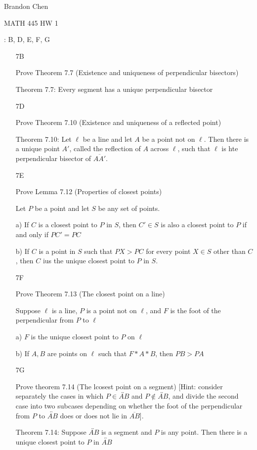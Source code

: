 \documentclass[11pt]{article}
\newcommand{\lines}[1]{\overleftrightarrow{#1}}
\newcommand{\segment}[1]{\overline{#1}}
\begin{document}
\noindent Brandon Chen

\noindent MATH 445 HW 1

: B, D, E, F, G

\begin{itemize}
\item[7B]

	Prove Theorem 7.7 (Existence and uniqueness of perpendicular bisectors)

	Theorem 7.7: Every segment has a unique perpendicular bisector

\item[7D]

	Prove Theorem 7.10 (Existence and uniqueness of a reflected point)

	Theorem 7.10: Let $\ell$ be a line and let $A$ be a point not on $\ell$. Then there is a unique point $A'$, called the reflection of $A$ across $\ell$, such that $\ell$ is hte perpendicular bisector of $\segment{AA'}$.

\item[7E]

	Prove Lemma 7.12 (Properties of closest points)

	Let $P$ be a point and let $S$ be any set of points.

		a) If $C$ is a closest point to $P$ in $S$, then $C' \in S$ is also a closest point to $P$ if and only if $PC' = PC$

		b) If $C$ is a point in $S$ such that $PX > PC$ for every point $X \in S$ other than $C$, then $C$ ius the unique closest point to $P$ in $S$.

\item[7F]

	Prove Theorem 7.13 (The closest point on a line)

	Suppose $\ell$ is a line, $P$ is a point not on $\ell$, and $F$ is the foot of the perpendicular from $P$ to $\ell$ 

	a) $F$ is the unique closest point to $P$ on $\ell$

	b) If $A, B$ are points on $\ell$ such that $F * A * B$, then $PB > PA$

\item[7G]

	Prove theorem 7.14 (The lcosest point on a segment) [Hint: consider separately the cases in which $P\in \lines{AB}$ and $P\not\in \lines{AB}$, and divide the second case into two subcases depending on whether the foot of the perpendicular from $P$ to $\lines{AB}$ does or does not lie in $\segment{AB}$].

	Theorem 7.14: Suppose $\lines{AB}$ is a segment and $P$ is any point. Then there is a unique closest point to $P$ in $\lines{AB}$
\end{itemize}
\end{document}

